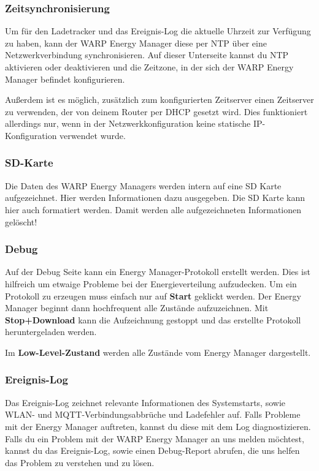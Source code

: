 \documentclass[a4paper,10pt]{article}
\newcommand{\gfx}[1]{\texttt{[image: \#1]}}
\begin{document}
\begin{multicols*}{2}
	\subsubsection{Zeitsynchronisierung}\label{ntp}
	Um für den Ladetracker und das Ereignis-Log die aktuelle Uhrzeit zur
	Verfügung zu haben, kann der WARP Energy Manager diese per NTP über
	eine Netzwerkverbindung synchronisieren. Auf dieser Unterseite kannst du NTP aktivieren oder deaktivieren und die Zeitzone, in der sich
	der WARP Energy Manager befindet konfigurieren.

	Außerdem ist es möglich, zusätzlich zum konfigurierten Zeitserver einen Zeitserver zu verwenden, der von deinem Router per DHCP gesetzt wird. Dies funktioniert allerdings nur,
	wenn in der Netzwerkkonfiguration keine statische IP-Konfiguration verwendet wurde.


	\subsubsection{SD-Karte}
	Die Daten des WARP Energy Managers werden intern auf eine SD Karte
	aufgezeichnet. Hier werden Informationen dazu ausgegeben. Die SD Karte kann
	hier auch formatiert werden. Damit werden alle aufgezeichneten Informationen
	gelöscht!

	\subsubsection{Debug}
	Auf der Debug Seite kann ein Energy Manager-Protokoll erstellt werden. Dies
	ist hilfreich um etwaige Probleme bei der Energieverteilung aufzudecken. Um
	ein Protokoll zu erzeugen muss einfach nur auf \textbf{Start} geklickt
	werden. Der Energy Manager beginnt dann hochfrequent alle Zustände
	aufzuzeichnen. Mit \textbf{Stop+Download} kann die Aufzeichnung gestoppt und
	das erstellte Protokoll heruntergeladen werden.

	Im \textbf{Low-Level-Zustand} werden alle Zustände vom Energy Manager
	dargestellt.

	\subsubsection{Ereignis-Log}

	Das Ereignis-Log zeichnet relevante Informationen des Systemstarts, sowie WLAN- und MQTT-Verbindungsabbrüche und Ladefehler auf.
	Falls Probleme mit der Energy Manager auftreten, kannst du diese mit dem Log diagnostizieren.
	Falls du ein Problem mit der WARP Energy Manager an uns melden möchtest, kannst du das Ereignis-Log,
	sowie einen Debug-Report abrufen, die uns helfen das Problem zu verstehen und zu lösen.


\end{multicols*}
\end{document}
